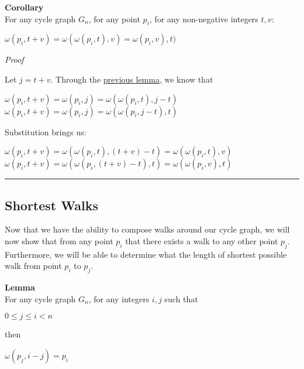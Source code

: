 \documentclass[a4paper,12pt]{article}
\begin{document}
\label{corollary:composition_of_walks}
\begin{tcolorbox}
\textbf{Corollary}\\
For any cycle graph $G_n$, for any point $p_i$, for any non-negative integers $t, v$:
\begin{center}
$\omega(p_i, t + v) = \omega(\omega(p_i, t), v) = \omega(p_i, v), t)$
\end{center}
\end{tcolorbox}

\noindent
\textit{Proof}

\noindent Let $j = t + v$. Through the \hyperref[lemma:composition_of_sub_walks]{previous lemma}, we know that
\begin{center}
$\omega(p_i, t + v) = \omega(p_i, j) = \omega(\omega(p_i, t), j - t)$\\
$\omega(p_i, t + v) = \omega(p_i, j) = \omega(\omega(p_i, j - t), t)$
\end{center}

\noindent Substitution brings us:
\begin{center}
$\omega(p_i, t + v) = \omega(\omega(p_i, t), (t + v) - t) = \omega(\omega(p_i, t), v)$
$\omega(p_i, t + v) = \omega(\omega(p_i, (t + v) - t), t) = \omega(\omega(p_i, v), t)$
\end{center}


\begin{center}
\noindent\rule{8cm}{0.4pt}
\end{center}



\subsection{Shortest Walks}
\label{sec:shortest_walks}

Now that we have the ability to compose walks around our cycle graph, we will now show that from any point $p_i$ that there exists a walk to any other point $p_j$. Furthermore, we will be able to determine what the length of shortest possible walk from point $p_i$ to $p_j$.\\

\label{lemma:existence_of_walk_1}
\begin{tcolorbox}
\textbf{Lemma}\\
For any cycle graph $G_n$, for any integers $i, j$ such that
\begin{center}
$0 \leq j \leq i < n$
\end{center}

\noindent then
\begin{center}
$\omega(p_j, i - j) = p_i$
\end{center}
\end{tcolorbox}
\end{document}

